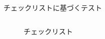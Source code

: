 \begin{frame}[shrink=10]{チェックリストに基づくテスト}
\begin{columns}[t]
\begin{column}{.35\textwidth}
\begin{figure}
        \begin{center}
            \begin{overlayarea}{\textwidth}{0.6\textheight}
            \begin{center}
            \end{center}
            \end{overlayarea}
        \caption{チェックリスト}
        \end{center}
        \end{figure}
    \end{column}
\end{columns}
\end{frame}
